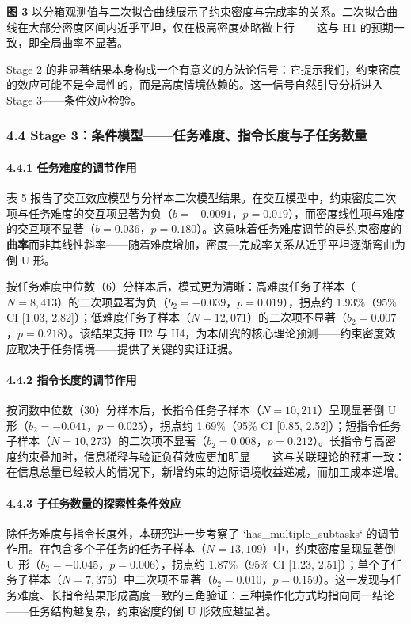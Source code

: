 \documentclass[12pt,a4paper,openany,oneside]{ctexrep}
\begin{document}
\textbf{图 3} 以分箱观测值与二次拟合曲线展示了约束密度与完成率的关系。二次拟合曲线在大部分密度区间内近乎平坦，仅在极高密度处略微上行——这与 H1 的预期一致，即全局曲率不显著。

Stage 2 的非显著结果本身构成一个有意义的方法论信号：它提示我们，约束密度的效应可能不是全局性的，而是高度情境依赖的。这一信号自然引导分析进入 Stage 3——条件效应检验。

\subsubsection{4.4 Stage 3：条件模型——任务难度、指令长度与子任务数量}


\paragraph{4.4.1 任务难度的调节作用}


表 5 报告了交互效应模型与分样本二次模型结果。在交互模型中，约束密度二次项与任务难度的交互项显著为负（$b=-0.0091$，$p=0.019$），而密度线性项与难度的交互项不显著（$b=0.036$，$p=0.180$）。这意味着任务难度调节的是约束密度的\textbf{曲率}而非其线性斜率——随着难度增加，密度—完成率关系从近乎平坦逐渐弯曲为倒 U 形。

按任务难度中位数（6）分样本后，模式更为清晰：高难度任务子样本（$N=8{,}413$）的二次项显著为负（$b_2=-0.039$，$p=0.019$），拐点约 1.93\%（95\% CI [1.03, 2.82]）；低难度任务子样本（$N=12{,}071$）的二次项不显著（$b_2=0.007$，$p=0.218$）。该结果支持 H2 与 H4，为本研究的核心理论预测——约束密度效应取决于任务情境——提供了关键的实证证据。

\paragraph{4.4.2 指令长度的调节作用}


按词数中位数（30）分样本后，长指令任务子样本（$N=10{,}211$）呈现显著倒 U 形（$b_2=-0.041$，$p=0.025$），拐点约 1.69\%（95\% CI [0.85, 2.52]）；短指令任务子样本（$N=10{,}273$）的二次项不显著（$b_2=0.008$，$p=0.212$）。长指令与高密度约束叠加时，信息稀释与验证负荷效应更加明显——这与关联理论的预期一致：在信息总量已经较大的情况下，新增约束的边际语境收益递减，而加工成本递增。

\paragraph{4.4.3 子任务数量的探索性条件效应}


除任务难度与指令长度外，本研究进一步考察了 `has\_multiple\_subtasks` 的调节作用。在包含多个子任务的任务子样本（$N=13{,}109$）中，约束密度呈现显著倒 U 形（$b_2=-0.045$，$p=0.006$），拐点约 1.87\%（95\% CI [1.23, 2.51]）；单个子任务子样本（$N=7{,}375$）中二次项不显著（$b_2=0.010$，$p=0.159$）。这一发现与任务难度、长指令结果形成高度一致的三角验证：三种操作化方式均指向同一结论——任务结构越复杂，约束密度的倒 U 形效应越显著。
\end{document}
